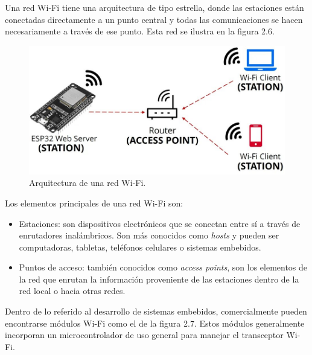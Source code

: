 
Una red Wi-Fi tiene una arquitectura de tipo estrella, donde las estaciones están conectadas directamente a un punto central y todas las comunicaciones se hacen necesariamente a través de ese punto. Esta red se ilustra en la figura 2.6. 

\begin{figure}[h]
	\centering
	\includegraphics[scale=0.35]{./Figures/wifi_architecture.jpg}
	\caption{Arquitectura de una red Wi-Fi\protect\footnotemark.}
	\label{fig:cuadradoAzul}
\end{figure}


Los elementos principales de una red Wi-Fi son:
\begin{itemize}
	\item Estaciones: son dispositivos electrónicos que se conectan entre sí a través de enrutadores inalámbricos. Son más conocidos como \textit{hosts} y pueden ser computadoras, tabletas, teléfonos celulares o sistemas embebidos.
	\item Puntos de acceso: también conocidos como \textit{access points}, son los elementos de la red que enrutan la información proveniente de las estaciones dentro de la red local o hacia otras redes.
\end{itemize}

Dentro de lo referido al desarrollo de sistemas embebidos, comercialmente pueden encontrarse módulos Wi-Fi como el de la figura 2.7. Estos módulos generalmente incorporan un microcontrolador de uso general para manejar el transceptor Wi-Fi.

